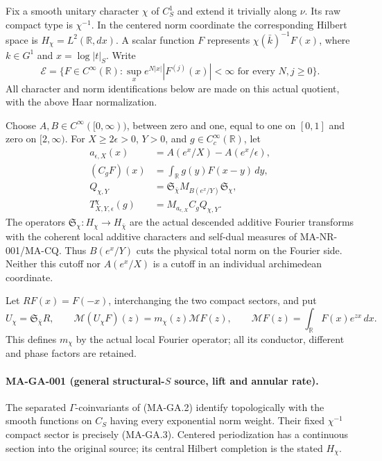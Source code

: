 Fix a smooth unitary character $\chi$ of $C_S^1$ and extend it
trivially along $\nu$.  Its raw compact type is $\chi^{-1}$.
In the centered norm coordinate the corresponding Hilbert space
is $H_\chi=L^2(\mathbb R,dx)$.  A scalar function $F$ represents
$\chi(\bar k)^{-1}F(x)$, where $k\in G^1$ and $x=\log|t|_S$.
Write
\[
 \mathcal E=\{F\in C^\infty(\mathbb R):
      \sup_x e^{N|x|}|F^{(j)}(x)|<\infty
          \text{ for every }N,j\geq0\}.
 \tag{MA-GA.3}
\]
All character and norm identifications below are made on this
actual quotient, with the above Haar normalization.

Choose $A,B\in C^\infty([0,\infty))$, between zero and one,
equal to one on $[0,1]$ and zero on $[2,\infty)$.  For
$X\geq2\epsilon>0$, $Y>0$, and $g\in C_c^\infty(\mathbb R)$,
let
\[
\begin{aligned}
 a_{\epsilon,X}(x)&=A(e^x/X)-A(e^x/\epsilon),\\
 (C_gF)(x)&=\int_{\mathbb R}g(y)F(x-y)\,dy,\\
 Q_{\chi,Y}&=\mathfrak S_{\bar\chi}
               M_{B(e^x/Y)}\mathfrak S_\chi,\\
 T^\chi_{X,Y,\epsilon}(g)&=M_{a_{\epsilon,X}}C_gQ_{\chi,Y}.
\end{aligned}
 \tag{MA-GA.4}
\]
The operators $\mathfrak S_\chi:H_\chi\to H_{\bar\chi}$ are
the actual descended additive Fourier transforms with the
coherent local additive characters and self-dual measures of
MA-NR-001/MA-CQ.  Thus $B(e^x/Y)$ cuts the physical total norm
on the Fourier side.  Neither this cutoff nor $A(e^x/X)$ is
a cutoff in an individual archimedean coordinate.

Let $RF(x)=F(-x)$, interchanging the two compact sectors, and put
\[
 U_\chi=\mathfrak S_{\bar\chi}R,
 \qquad \mathcal M(U_\chi F)(z)=m_\chi(z)\mathcal MF(z),
 \qquad \mathcal MF(z)=\int_{\mathbb R}F(x)e^{zx}\,dx.
 \tag{MA-GA.5}
\]
This defines $m_\chi$ by the actual local Fourier operator;
all its conductor, different and phase factors are retained.

\paragraph{MA-GA-001 (general structural-$S$ source, lift and annular rate).}
The separated $\Gamma$-coinvariants of (MA-GA.2) identify
topologically with the smooth functions on $C_S$ having every
exponential norm weight.  Their fixed $\chi^{-1}$ compact
sector is precisely (MA-GA.3).  Centered periodization has a
continuous section into the original source; its central
Hilbert completion is the stated $H_\chi$.

